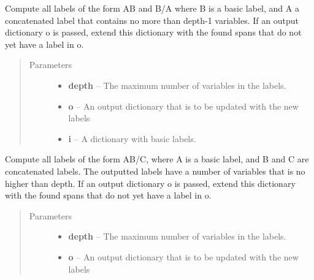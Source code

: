 \documentclass[letterpaper,10pt,english]{sphinxmanual}
\begin{document}
\begin{fulllineitems}
\begin{fulllineitems}
\label{labelling:labelling.Labels.minus}
Compute all labels of the form AB and B/A
where B is a basic label, and A a concatenated label that
contains no more than depth-1 variables.
If an output dictionary o is passed, extend this dictionary
with the found spans that do not yet have a label in o.
\begin{quote}\begin{description}
\item[{Parameters}] \leavevmode\begin{itemize}
\item {} 
\textbf{depth} -- The maximum number of variables in the labels.

\item {} 
\textbf{o} -- An output dictionary that is to be updated with the new labels

\item {} 
\textbf{i} -- A dictionary with basic labels.

\end{itemize}

\end{description}\end{quote}

\end{fulllineitems}


\begin{fulllineitems}
\label{labelling:labelling.Labels.minus_double}
Compute all labels of the form AB/C, where 
A is a basic label, and B and C are concatenated
labels. The outputted labels have a number of variables
that is no higher than depth.
If an output dictionary o is passed, extend this dictionary
with the found spans that do not yet have a label in o.
\begin{quote}\begin{description}
\item[{Parameters}] \leavevmode\begin{itemize}
\item {} 
\textbf{depth} -- The maximum number of variables in the labels.

\item {} 
\textbf{o} -- An output dictionary that is to be updated with the new labels


\end{itemize}
\end{description}
\end{quote}
\end{fulllineitems}
\end{fulllineitems}
\end{document}
